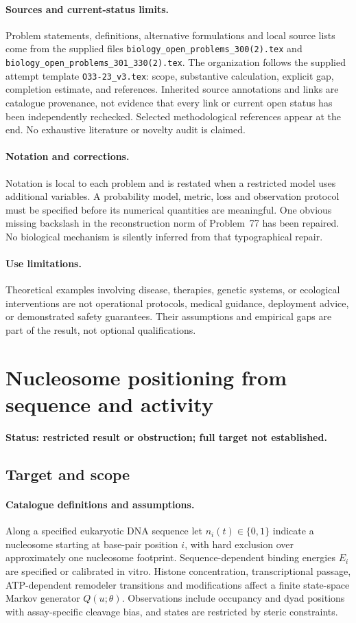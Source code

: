 \documentclass[11pt]{article}
\begin{document}
\paragraph{Sources and current-status limits.}
Problem statements, definitions, alternative formulations and local source lists
come from the supplied files
\texttt{biology\_open\_problems\_300(2).tex} and
\texttt{biology\_open\_problems\_301\_330(2).tex}.
The organization follows the supplied attempt template
\texttt{O33-23\_v3.tex}: scope, substantive calculation, explicit gap,
completion estimate, and references. Inherited source annotations and links are
catalogue provenance, not evidence that every link or current open status has
been independently rechecked. Selected methodological references appear at the
end. No exhaustive literature or novelty audit is claimed.

\paragraph{Notation and corrections.}
Notation is local to each problem and is restated when a restricted model uses
additional variables. A probability model, metric, loss and observation protocol
must be specified before its numerical quantities are meaningful. One obvious
missing backslash in the reconstruction norm of Problem~77 has been repaired.
No biological mechanism is silently inferred from that typographical repair.

\paragraph{Use limitations.}
Theoretical examples involving disease, therapies, genetic systems, or ecological
interventions are not operational protocols, medical guidance, deployment advice,
or demonstrated safety guarantees. Their assumptions and empirical gaps are part
of the result, not optional qualifications.


\section*{Nucleosome positioning from sequence and activity}
\label{prob:096}
\noindent\textbf{Status: restricted result or obstruction; full target not established.}
\subsection{Target and scope}
\paragraph{Catalogue definitions and assumptions.}
Along a specified eukaryotic DNA sequence let $n_i(t)\in\{0,1\}$ indicate a nucleosome starting at base-pair position $i$, with hard exclusion over approximately one nucleosome footprint. Sequence-dependent binding energies $E_i$ are specified or calibrated in vitro. Histone concentration, transcriptional passage, ATP-dependent remodeler transitions and modifications affect a finite state-space Markov generator $Q(u;\theta)$. Observations include occupancy and dyad positions with assay-specific cleavage bias, and states are restricted by steric constraints.
\end{document}
